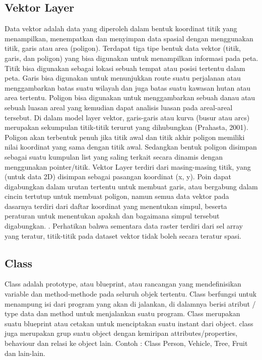 \subsection{Vektor Layer}
Data vektor adalah data yang diperoleh dalam bentuk koordinat titik yang menampilkan, 
menempatkan dan menyimpan data spasial dengan menggunakan titik, garis atau area (poligon). 
Terdapat tiga tipe bentuk data vektor (titik, garis, dan poligon) yang bisa digunakan untuk menampilkan informasi pada peta. 
Titik bisa digunakan sebagai lokasi sebuah tempat atau posisi tertentu dalam peta. 
Garis bisa digunakan untuk menunjukkan route suatu perjalanan atau menggambarkan batas suatu wilayah 
dan juga batas suatu kawasan hutan atau area tertentu. 
Poligon bisa digunakan untuk menggambarkan sebuah danau atau sebuah luasan areal yang kemudian dapat analisis luasan 
pada areal-areal tersebut.
Di dalam model layer vektor, garis-garis atau kurva (busur atau arcs) merupakan sekumpulan titik-titik terurut yang dihubungkan (Prahasta, 2001). Poligon akan terbentuk penuh jika titik awal dan titik akhir poligon memiliki nilai koordinat yang sama dengan titik awal. Sedangkan bentuk poligon disimpan sebagai suatu kumpulan list yang saling terkait secara dinamis dengan menggunakan pointer/titik.
Vektor Layer terdiri dari masing-masing titik, yang (untuk data 2D) disimpan sebagai pasangan koordinat (x, y). 
Poin dapat digabungkan dalam urutan tertentu untuk membuat garis, atau bergabung dalam cincin tertutup untuk 
membuat poligon, namun semua data vektor pada dasarnya terdiri dari daftar koordinat yang menentukan simpul, 
beserta peraturan untuk menentukan apakah dan bagaimana simpul tersebut digabungkan. .
Perhatikan bahwa sementara data raster terdiri dari sel array yang teratur, 
titik-titik pada dataset vektor tidak boleh secara teratur spasi.

\subsection{Class}
Class adalah prototype, atau blueprint, atau rancangan yang mendefinisikan variable dan method-methode pada seluruh objek tertentu. 
Class berfungsi untuk menampung isi dari program yang akan di jalankan, di dalamnya berisi atribut / type data dan method untuk menjalankan suatu program.
Class merupakan suatu blueprint atau cetakan untuk menciptakan suatu instant dari  object. 
class juga merupakan grup suatu object dengan kemiripan attributes/properties, behaviour dan relasi ke object lain. 
Contoh : Class Person, Vehicle, Tree, Fruit dan lain-lain.

